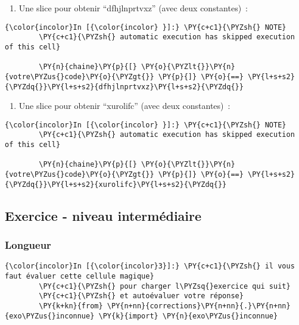     \begin{enumerate}
\def\labelenumi{\arabic{enumi})}
\setcounter{enumi}{2}
\tightlist
\item
  Une slice pour obtenir ``dfhjlnprtvxz'' (avec deux constantes)~:
\end{enumerate}

    \begin{Verbatim}[commandchars=\\\{\}]
{\color{incolor}In [{\color{incolor} }]:} \PY{c+c1}{\PYZsh{} NOTE}
        \PY{c+c1}{\PYZsh{} automatic execution has skipped execution of this cell}
        
        \PY{n}{chaine}\PY{p}{[} \PY{o}{\PYZlt{}}\PY{n}{votre\PYZus{}code}\PY{o}{\PYZgt{}} \PY{p}{]} \PY{o}{==} \PY{l+s+s2}{\PYZdq{}}\PY{l+s+s2}{dfhjlnprtvxz}\PY{l+s+s2}{\PYZdq{}}
\end{Verbatim}


    \begin{enumerate}
\def\labelenumi{\arabic{enumi})}
\setcounter{enumi}{3}
\tightlist
\item
  Une slice pour obtenir ``xurolifc'' (avec deux constantes)~:
\end{enumerate}

    \begin{Verbatim}[commandchars=\\\{\}]
{\color{incolor}In [{\color{incolor} }]:} \PY{c+c1}{\PYZsh{} NOTE}
        \PY{c+c1}{\PYZsh{} automatic execution has skipped execution of this cell}
        
        \PY{n}{chaine}\PY{p}{[} \PY{o}{\PYZlt{}}\PY{n}{votre\PYZus{}code}\PY{o}{\PYZgt{}} \PY{p}{]} \PY{o}{==} \PY{l+s+s2}{\PYZdq{}}\PY{l+s+s2}{xurolifc}\PY{l+s+s2}{\PYZdq{}}
\end{Verbatim}


    \hypertarget{exercice---niveau-intermuxe9diaire}{%
\subsection{Exercice - niveau
intermédiaire}\label{exercice---niveau-intermuxe9diaire}}

    \hypertarget{longueur}{%
\subsubsection{Longueur}\label{longueur}}

    \begin{Verbatim}[commandchars=\\\{\}]
{\color{incolor}In [{\color{incolor}3}]:} \PY{c+c1}{\PYZsh{} il vous faut évaluer cette cellule magique}
        \PY{c+c1}{\PYZsh{} pour charger l\PYZsq{}exercice qui suit}
        \PY{c+c1}{\PYZsh{} et autoévaluer votre réponse}
        \PY{k+kn}{from} \PY{n+nn}{corrections}\PY{n+nn}{.}\PY{n+nn}{exo\PYZus{}inconnue} \PY{k}{import} \PY{n}{exo\PYZus{}inconnue}
\end{Verbatim}


